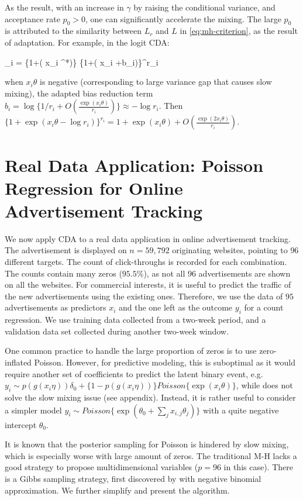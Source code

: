 \documentclass[10pt]{article}
\newcommand{\xbeta}{ x_i \theta}
\newcommand{\be}{\begin{equs}}
\newcommand{\ee}{\end{equs}}
\begin{document}
As the result, with an increase in $\gamma$ by raising the conditional variance, and acceptance rate $p_0>0$, one can significantly accelerate the mixing. The large $p_0$ is attributed to the similarity between $L_r$ and $L$ in \eqref{eq:mh-criterion}, as the result of adaptation. For example, in the logit CDA:

\be
\alpha_i = \frac{ \{1+\exp(\xbeta)\}   \{1+\exp(\xbeta^*+b_i)\}^{r_i} } {  \{1+\exp(\xbeta^*)\}  \{1+\exp(\xbeta+b_i)\}^{r_i}    } 
\ee
when $\xbeta$ is negative (corresponding to large variance gap that causes slow mixing), the adapted bias reduction term $b_i  = \log\{ 1/r_{i} + O (\frac{\exp(\xbeta)}{r_i} )\} \approx -\log r_i$. Then $\{ 1+\exp(\xbeta-\log r_i)\}^{r_i} = 1+\exp(\xbeta) + O(\frac{\exp(2\xbeta) }{r_i})$.


\section{Real Data Application: Poisson Regression for Online Advertisement Tracking}

We now apply CDA to a real data application in online advertisement tracking. The advertisement is displayed on $n=59,792$ originating websites, pointing to $96$ different targets. The count of click-throughs is recorded for each combination. The counts contain many zeros ($95.5\%$), as not all $96$ advertisements are shown on all the websites. For commercial interests, it is useful  to predict the traffic of the new advertisements using the existing ones. Therefore, we use the data of $95$ advertisements as predictors $x_i$ and the one left as the outcome $y_i$ for a count regression. We use training data collected from a two-week period, and a validation data set collected during another two-week window. 

One common practice to handle the large proportion of zeros is to use zero-inflated Poisson. However, for predictive modeling, this is suboptimal as it would require another set of coefficients to predict the latent binary event, e.g. $y_i\sim p\left( g(x_i\eta)\right)  \delta_0+ \{ 1-p\left( g(x_i \eta) \right) \} Poisson\{\exp (x_i \theta)\}$, while does not solve the slow mixing issue (see appendix). Instead, it is rather useful to consider a simpler model  $y_i\sim Poisson\{\exp(\theta_0+ \sum_j x_{i,j}\theta_j)\}$ with a quite negative intercept $\theta_0$.

It is known that the posterior sampling for Poisson is hindered by slow mixing, which is especially worse with large amount of zeros. The traditional M-H lacks a good strategy to propose multidimensional variables ($p=96$ in this case). There is a Gibbs sampling strategy, first discovered by \citep{zhou2012lognormal} with negative binomial approximation. We further simplify and present the algorithm.
\end{document}
